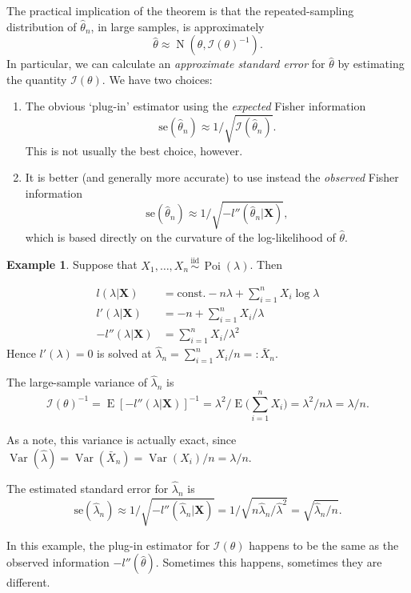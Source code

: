 \documentclass[
]{book}
\newcommand{\bX}{{\boldsymbol X}}
\DeclareMathOperator{\E}{E}
\DeclareMathOperator{\Var}{Var}
\DeclareMathOperator{\N}{N}
\DeclareMathOperator{\Pois}{Poi}
\newcommand{\iid}{\,\overset{\text{iid}}{\sim}\,}
\newcommand{\cI}{{\mathcal I}}
\newcommand{\const}{\text{const.}}
\theoremstyle{definition}
\theoremstyle{definition}
\newtheorem{example}{Example}[chapter]
\theoremstyle{definition}
\theoremstyle{definition}
\theoremstyle{remark}
\begin{document}
The practical implication of the theorem is that the repeated-sampling distribution of \(\hat\theta_n\), in large samples, is approximately
\[
\hat\theta \approx \N\left(\theta, \cI(\theta)^{-1} \right).
\]
In particular, we can calculate an \emph{approximate standard error} for \(\hat\theta\) by estimating the quantity \(\cI(\theta).\) We have two choices:

\begin{enumerate}
\def\labelenumi{\arabic{enumi}.}
\item
  The obvious `plug-in' estimator using the \emph{expected} Fisher information
  \[
  \text{se}(\hat\theta_n) \approx 1\Big/\sqrt{\cI(\hat\theta_n)}.
  \]
  This is not usually the best choice, however.
\item
  It is better (and generally more accurate) to use instead the \emph{observed} Fisher information
  \[
  \text{se}(\hat\theta_n) \approx 1\Big/\sqrt{-l''(\hat\theta_n|\bX)},
  \]
  which is based directly on the curvature of the log-likelihood of \(\hat\theta\).
\end{enumerate}

\begin{example}
Suppose that \(X_1,\dots,X_n\iid\Pois(\lambda)\). Then

\begin{align*}
l(\lambda|\bX) &= \const - n\lambda +\sum_{i=1}^n X_i \log \lambda \\
l'(\lambda|\bX) &= - n +\sum_{i=1}^n X_i / \lambda \\ 
-l''(\lambda|\bX) &=  \sum_{i=1}^n X_i / \lambda^2 
\end{align*}
Hence \(l'(\lambda)=0\) is solved at \(\hat\lambda_n = \sum_{i=1}^n X_i / n =: \bar X_n\).

The large-sample variance of \(\hat\lambda_n\) is
\[
\cI(\theta)^{-1} = \E\left[-l''(\lambda|\bX) \right]^{-1} = \lambda^2 \big/ \E\bigg(\sum_{i=1}^n X_i\bigg) = \lambda^2 / n\lambda = \lambda /n.
\]

As a note, this variance is actually exact, since \(\Var(\hat\lambda)=\Var(\bar X_n)=\Var(X_i)/n=\lambda/n\).

The estimated standard error for \(\hat\lambda_n\) is
\[
\text{se}(\hat\lambda_n) \approx 1\Big/\sqrt{-l''(\hat\lambda_n|\bX)} = 1\Big/\sqrt{n\hat\lambda_n/\hat\lambda^2} = \sqrt{\hat\lambda_n/n}.
\]
\end{example}

In this example, the plug-in estimator for \(\cI(\theta)\) happens to be the same as the observed information \(-l''(\hat\theta)\). Sometimes this happens, sometimes they are different.
\end{document}
